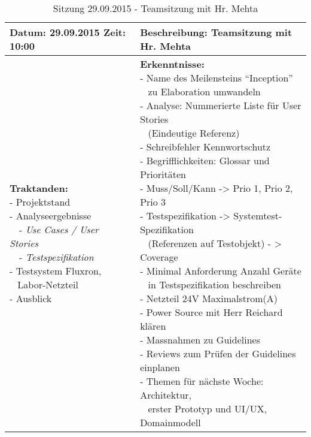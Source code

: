 \begin{table}[H]
\begin{tabularx}{\textwidth}{| l | X |}
\hline
\textbf{Datum:} 29.09.2015
\textbf{Zeit:} 10:00
&
\textbf{Beschreibung:} Teamsitzung mit Hr. Mehta \\ \hline
\specialcell[t]{
\textbf{Traktanden:}\\
- Projektstand\\
- Analyseergebnisse\\
~~- \textit{Use Cases / User Stories}\\
~~- \textit{Testspezifikation}\\
- Testsystem Fluxron,\\~ Labor-Netzteil\\
- Ausblick\\
}
& 
\specialcell[t]{
\textbf{Erkenntnisse:}\\
- Name des Meilensteins \enquote{Inception} \\~ zu Elaboration umwandeln\\
- Analyse: Nummerierte Liste für User Stories\\~ (Eindeutige Referenz)\\
- Schreibfehler Kennwortschutz\\
- Begrifflichkeiten: Glossar und Prioritäten\\
- Muss/Soll/Kann -> Prio 1, Prio 2, Prio 3\\
- Testspezifikation -> Systemtest-Spezifikation\\~ (Referenzen auf Testobjekt) - > Coverage\\
- Minimal Anforderung Anzahl Geräte\\~ in Testspezifikation beschreiben\\
- Netzteil 24V Maximalstrom(A)\\
- Power Source mit Herr Reichard klären\\
- Massnahmen zu Guidelines\\
- Reviews zum Prüfen der Guidelines einplanen\\
- Themen für nächste Woche: Architektur,\\~ erster Prototyp und UI/UX, Domainmodell\\
}
\\ \hline
\end{tabularx}
\caption{Sitzung 29.09.2015 - Teamsitzung mit Hr. Mehta}
\end{table}



